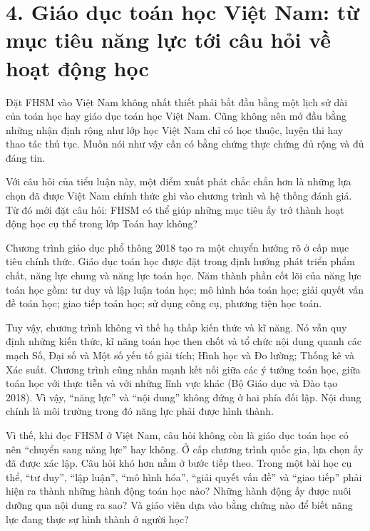 {}
\section*{4. Giáo dục toán học Việt Nam: từ mục tiêu năng lực tới câu hỏi về hoạt động học}

Đặt FHSM vào Việt Nam không nhất thiết phải bắt đầu bằng một lịch sử dài của toán học hay giáo dục toán học Việt Nam. Cũng không nên mở đầu bằng những nhận định rộng như lớp học Việt Nam chỉ có học thuộc, luyện thi hay thao tác thủ tục. Muốn nói như vậy cần có bằng chứng thực chứng đủ rộng và đủ đáng tin.

Với câu hỏi của tiểu luận này, một điểm xuất phát chắc chắn hơn là những lựa chọn đã được Việt Nam chính thức ghi vào chương trình và hệ thống đánh giá. Từ đó mới đặt câu hỏi: FHSM có thể giúp những mục tiêu ấy trở thành hoạt động học cụ thể trong lớp Toán hay không?

Chương trình giáo dục phổ thông 2018 tạo ra một chuyển hướng rõ ở cấp mục tiêu chính thức. Giáo dục toán học được đặt trong định hướng phát triển phẩm chất, năng lực chung và năng lực toán học. Năm thành phần cốt lõi của năng lực toán học gồm: tư duy và lập luận toán học; mô hình hóa toán học; giải quyết vấn đề toán học; giao tiếp toán học; sử dụng công cụ, phương tiện học toán.

Tuy vậy, chương trình không vì thế hạ thấp kiến thức và kĩ năng. Nó vẫn quy định những kiến thức, kĩ năng toán học then chốt và tổ chức nội dung quanh các mạch Số, Đại số và Một số yếu tố giải tích; Hình học và Đo lường; Thống kê và Xác suất. Chương trình cũng nhấn mạnh kết nối giữa các ý tưởng toán học, giữa toán học với thực tiễn và với những lĩnh vực khác (Bộ Giáo dục và Đào tạo 2018). Vì vậy, ``năng lực'' và ``nội dung'' không đứng ở hai phía đối lập. Nội dung chính là môi trường trong đó năng lực phải được hình thành.

Vì thế, khi đọc FHSM ở Việt Nam, câu hỏi không còn là giáo dục toán học có nên ``chuyển sang năng lực'' hay không. Ở cấp chương trình quốc gia, lựa chọn ấy đã được xác lập. Câu hỏi khó hơn nằm ở bước tiếp theo. Trong một bài học cụ thể, ``tư duy'', ``lập luận'', ``mô hình hóa'', ``giải quyết vấn đề'' và ``giao tiếp'' phải hiện ra thành những hành động toán học nào? Những hành động ấy được nuôi dưỡng qua nội dung ra sao? Và giáo viên dựa vào bằng chứng nào để biết năng lực đang thực sự hình thành ở người học?

